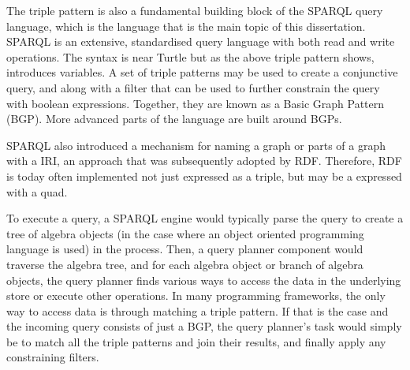 The triple pattern is also a fundamental building block of the SPARQL
query language, which is the language that is the main topic of this
dissertation. SPARQL is an extensive, standardised query language with
both read and write operations. The syntax is near Turtle but as the
above triple pattern shows, introduces variables. A set of triple patterns
may be used to create a conjunctive query, and along with a filter
that can be used to further constrain the query with boolean
expressions. Together, they are known as a Basic Graph Pattern
(BGP). More advanced parts of the language are built around BGPs.

SPARQL also introduced a mechanism for naming a graph or parts of a
graph with a IRI, an approach that was subsequently adopted by
RDF. Therefore, RDF is today often implemented not just expressed as
a triple, but may be a expressed with a quad.

To execute a query, a SPARQL engine would typically parse the query to
create a tree of algebra objects (in the case where an object oriented
programming language is used) in the process. Then, a query planner
component would traverse the algebra tree, and for each algebra object
or branch of algebra objects, the query planner finds various ways to
access the data in the underlying store or execute other
operations. In many programming frameworks, the only way to access
data is through matching a triple pattern. If that is the case and
the incoming query consists of just a BGP, the query planner's task
would simply be to match all the triple patterns and join their
results, and finally apply any constraining filters. 

